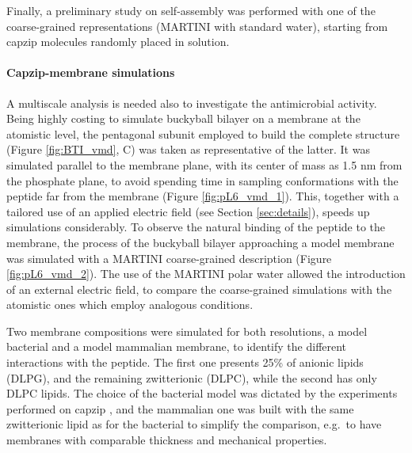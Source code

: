 Finally, a preliminary study on self-assembly was performed with one of the coarse-grained representations (MARTINI with standard water), starting from capzip molecules randomly placed in solution.

\paragraph{Capzip-membrane simulations} A multiscale analysis is needed also to investigate the antimicrobial activity. Being highly costing to simulate buckyball bilayer on a membrane at the atomistic level, the pentagonal subunit employed to build the complete structure (Figure \ref{fig:BTI_vmd}, C) was taken as representative of the latter. It was simulated parallel to the membrane plane, with its center of mass as 1.5 nm from the phosphate plane, to avoid spending time in sampling conformations with the peptide far from the membrane (Figure \ref{fig:pL6_vmd_1}). This, together with a tailored use of an applied electric field (see Section \ref{sec:details}), speeds up simulations considerably.
%
To observe the natural binding of the peptide to the membrane, the process of the buckyball bilayer approaching a model membrane was simulated with a MARTINI coarse-grained description (Figure \ref{fig:pL6_vmd_2}). The use of the MARTINI polar water \citep{Yesylevskyy2010} allowed the introduction of an external electric field, to compare the coarse-grained simulations with the atomistic ones which employ analogous conditions.

Two membrane compositions were simulated for both resolutions, a model bacterial and a model mammalian membrane, to identify the different interactions with the peptide. The first one presents 25\% of anionic lipids (DLPG), and the remaining zwitterionic (DLPC), while the second has only DLPC lipids. The choice of the bacterial model was dictated by the experiments performed on capzip \citep{Castelletto2016}, and the mammalian one was built with the same zwitterionic lipid as for the bacterial to simplify the comparison, e.g.\ to have membranes with comparable thickness and mechanical properties.

